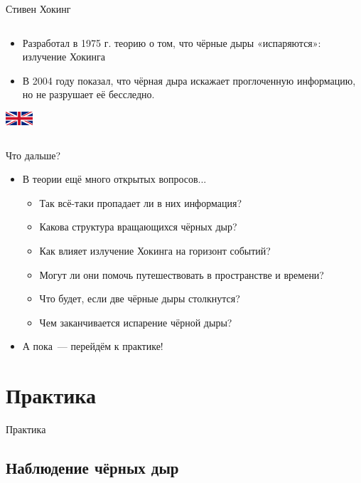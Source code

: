 \documentclass[usenames,dvipsnames,pdftex,unicode,hidelinks]{beamer}
\newcommand{\splashsection}[1]{
    \section{#1}
    \begin{frame}[plain]
      \begin{center}
        \LARGE #1
      \end{center}
    \end{frame}
  }
\begin{document}
\begin{frame}{Стивен Хокинг}
\begin{columns}[t]
\begin{column}{0.75\textwidth}
\begin{itemize}
          \item<3-> Разработал в 1975 г. теорию о том, что чёрные дыры «испаряются»: \alert{излучение Хокинга}
          \item<4-> В 2004 году показал, что чёрная дыра искажает
            проглоченную информацию, но не разрушает её бесследно.
        \end{itemize}
        \begin{center}
          \includegraphics[width=1cm]{britain}
        \end{center}
      \end{column}
    \end{columns}
  \end{frame}

  \begin{frame}{Что дальше?}
    \begin{itemize}
      \item В теории ещё много открытых вопросов...
        \begin{itemize}
          \item Так всё-таки пропадает ли в них информация?
          \item Какова структура вращающихся чёрных дыр?
          \item Как влияет излучение Хокинга на горизонт событий?
          \item Могут ли они помочь путешествовать в пространстве и времени?
          \item Что будет, если две чёрные дыры столкнутся?
          \item Чем заканчивается испарение чёрной дыры?
        \end{itemize}
      \item А пока~--- перейдём к практике!
    \end{itemize}
  \end{frame}

  \splashsection{Практика}

  \subsection{Наблюдение чёрных дыр}
\end{document}
